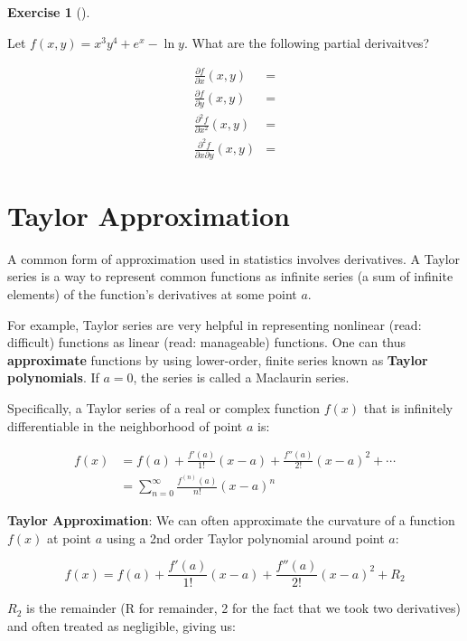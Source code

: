 \documentclass[
  letterpaper,
]{book}
\theoremstyle{definition}
\theoremstyle{definition}
\theoremstyle{plain}
\theoremstyle{definition}
\newtheorem{exercise}{Exercise}[chapter]
\theoremstyle{plain}
\theoremstyle{plain}
\theoremstyle{remark}
\begin{document}
\leavevmode{}%
\begin{exercise}[]\label{exr-}

Let \(f(x,y)=x^3 y^4 +e^x -\ln y\). What are the following partial
derivaitves?

\begin{align*}
\frac{\partial f}{\partial x}(x,y) &=\\
\frac{\partial f}{\partial y}(x,y) &=\\
\frac{\partial^2 f}{\partial x^2}(x,y) &=\\
\frac{\partial^2 f}{\partial x \partial y}(x,y) &= 
\end{align*}

\end{exercise}

\hypertarget{taylorapprox}{%
\section{Taylor Approximation}\label{taylorapprox}}

A common form of approximation used in statistics involves derivatives.
A Taylor series is a way to represent common functions as infinite
series (a sum of infinite elements) of the function's derivatives at
some point \(a\).

For example, Taylor series are very helpful in representing nonlinear
(read: difficult) functions as linear (read: manageable) functions. One
can thus \textbf{approximate} functions by using lower-order, finite
series known as \textbf{Taylor polynomials}. If \(a=0\), the series is
called a Maclaurin series.

Specifically, a Taylor series of a real or complex function \(f(x)\)
that is infinitely differentiable in the neighborhood of point \(a\) is:

\begin{align*}
    f(x) &= f(a) + \frac{f'(a)}{1!} (x-a) +  \frac{f''(a)}{2!} (x-a)^2 + \cdots\\
     &= \sum_{n=0}^\infty \frac{f^{(n)} (a)}{n!} (x-a)^n
\end{align*}

\textbf{Taylor Approximation}: We can often approximate the curvature of
a function \(f(x)\) at point \(a\) using a 2nd order Taylor polynomial
around point \(a\):

\[f(x) = f(a) + \frac{f'(a)}{1!} (x-a) +  \frac{f''(a)}{2!} (x-a)^2 + R_2\]

\(R_2\) is the remainder (R for remainder, 2 for the fact that we took
two derivatives) and often treated as negligible, giving us:
\end{document}

